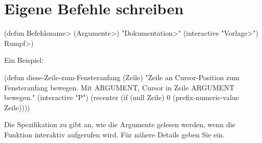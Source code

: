 \section{Eigene Befehle schreiben}

\beginexample%
(defun \<Befehlsname> (\<Argumente>)
  "\<Dokumentation>"
  (interactive "\<Vorlage>")
  \<Rumpf>)
\endexample

Ein Beispiel:

\beginexample%
(defun diese-Zeile-zum-Fensteranfang (Zeile)
  "Zeile an Cursor-Position zum Fensteranfang bewegen.
Mit ARGUMENT, Cursor in Zeile ARGUMENT bewegen."
  (interactive "P")
  (recenter (if (null Zeile)
                0
              (prefix-numeric-value Zeile))))
\endexample

Die Spezifikation zu  gibt an, wie die Argumente
gelesen werden, wenn die Funktion inter\-aktiv auf\-ge\-ru\-fen
wird. F\"ur n\"ahere Details geben Sie  ein.

\copyrightnotice

\bye


